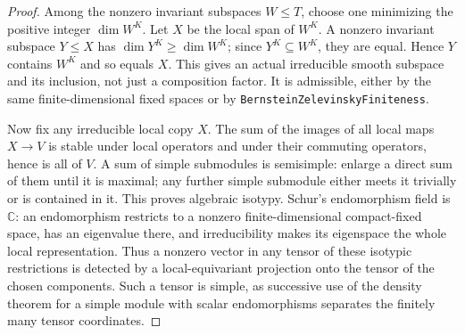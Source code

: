 \begin{proof}
Among the nonzero invariant subspaces \(W\le T\), choose one
minimizing the positive integer \(\dim W^K\).  Let \(X\) be the
local span of \(W^K\).  A nonzero invariant subspace \(Y\le X\)
has \(\dim Y^K\ge\dim W^K\); since \(Y^K\subseteq W^K\),
they are equal.  Hence \(Y\) contains \(W^K\) and so equals
\(X\).  This gives an actual irreducible smooth subspace and its
inclusion, not just a composition factor.  It is admissible, either
by the same finite-dimensional fixed spaces or by
\texttt{BernsteinZelevinskyFiniteness}.

Now fix any irreducible local copy \(X\).  The sum of the images
of all local maps \(X\to V\) is stable under local operators and
under their commuting operators, hence is all of \(V\).  A sum of
simple submodules is semisimple: enlarge a direct sum of them until
it is maximal; any further simple submodule either meets it trivially
or is contained in it.  This proves algebraic isotypy.  Schur's
endomorphism field is \(\mathbb C\): an endomorphism restricts to
a nonzero finite-dimensional compact-fixed space, has an eigenvalue
there, and irreducibility makes its eigenspace the whole local
representation.  Thus a nonzero vector in any tensor of these
isotypic restrictions is detected by a local-equivariant projection
onto the tensor of the chosen components.  Such a tensor is simple,
as successive use of the density theorem for a simple module with
scalar endomorphisms separates the finitely many tensor coordinates.
\end{proof}

